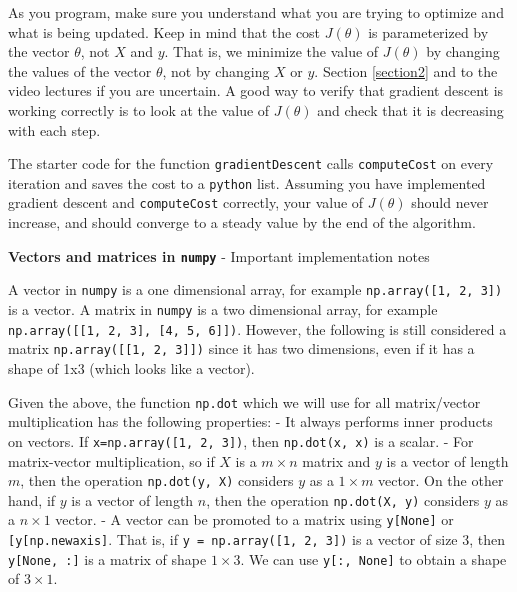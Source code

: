 \documentclass[11pt]{article}
\begin{document}
As you program, make sure you understand what you are trying to optimize
and what is being updated. Keep in mind that the cost \(J(\theta)\) is
parameterized by the vector \(\theta\), not \(X\) and \(y\). That is, we
minimize the value of \(J(\theta)\) by changing the values of the vector
\(\theta\), not by changing \(X\) or \(y\). Section \ref{section2} and
to the video lectures if you are uncertain. A good way to verify that
gradient descent is working correctly is to look at the value of
\(J(\theta)\) and check that it is decreasing with each step.

The starter code for the function \texttt{gradientDescent} calls
\texttt{computeCost} on every iteration and saves the cost to a
\texttt{python} list. Assuming you have implemented gradient descent and
\texttt{computeCost} correctly, your value of \(J(\theta)\) should never
increase, and should converge to a steady value by the end of the
algorithm.

\textbf{Vectors and matrices in \texttt{numpy}} - Important
implementation notes

A vector in \texttt{numpy} is a one dimensional array, for example
\texttt{np.array({[}1,\ 2,\ 3{]})} is a vector. A matrix in
\texttt{numpy} is a two dimensional array, for example
\texttt{np.array({[}{[}1,\ 2,\ 3{]},\ {[}4,\ 5,\ 6{]}{]})}. However, the
following is still considered a matrix
\texttt{np.array({[}{[}1,\ 2,\ 3{]}{]})} since it has two dimensions,
even if it has a shape of 1x3 (which looks like a vector).

Given the above, the function \texttt{np.dot} which we will use for all
matrix/vector multiplication has the following properties: - It always
performs inner products on vectors. If
\texttt{x=np.array({[}1,\ 2,\ 3{]})}, then \texttt{np.dot(x,\ x)} is a
scalar. - For matrix-vector multiplication, so if \(X\) is a
\(m\times n\) matrix and \(y\) is a vector of length \(m\), then the
operation \texttt{np.dot(y,\ X)} considers \(y\) as a \(1 \times m\)
vector. On the other hand, if \(y\) is a vector of length \(n\), then
the operation \texttt{np.dot(X,\ y)} considers \(y\) as a \(n \times 1\)
vector. - A vector can be promoted to a matrix using
\texttt{y{[}None{]}} or \texttt{{[}y{[}np.newaxis{]}}. That is, if
\texttt{y\ =\ np.array({[}1,\ 2,\ 3{]})} is a vector of size 3, then
\texttt{y{[}None,\ :{]}} is a matrix of shape \(1 \times 3\). We can use
\texttt{y{[}:,\ None{]}} to obtain a shape of \(3 \times 1\).
\end{document}
